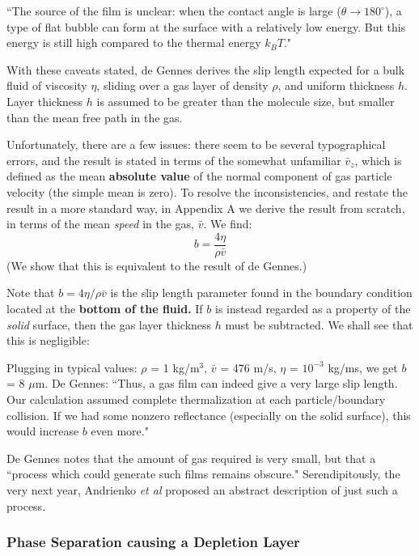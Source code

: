 \documentclass[12pt, a4paper, twoside, openright]{book}
\begin{document}
``The source of the film is unclear: when the contact angle is large ($\theta \rightarrow 180^{\circ}$), a type of flat bubble can form at the surface with a relatively low energy.  But this energy is still high compared to the thermal energy $k_{B} T$."

With these caveats stated, de Gennes derives the slip length expected for a bulk fluid of viscosity $\eta$, sliding over a gas layer of density $\rho$, and uniform thickness $h$. Layer thickness $h$ is assumed to be greater than the molecule size, but smaller than the mean free path in the gas.

Unfortunately, there are a few issues: there seem to be several typographical errors, and the result is stated in terms of the somewhat unfamiliar $\bar{v}_{z}$, which is  %
defined as the mean \textbf{absolute value} of the normal component of gas particle velocity (the simple mean is zero).  To resolve the inconsistencies, and restate the result in a more standard way, in Appendix A we derive the result from scratch, in terms of the mean \emph{speed} in the gas, $\bar{v}$.  We find:
\begin{equation}
b = \frac{4 \eta}{\rho \bar{v}}
\end{equation}
(We show that this is equivalent to the result of de Gennes.)

Note that $b = 4 \eta/ \rho \bar{v}$ is the slip length parameter found in the boundary condition located at the \textbf{bottom of the fluid.}  If $b$ is instead regarded as a property of the \emph{solid} surface, then the gas layer thickness $h$ must be subtracted.  We shall see that this is negligible:

Plugging in typical values: $\rho$ = 1 kg/m$^{3}$, $\bar{v}$ = 476 m/s, $\eta$ = $10^{-3}$ kg/ms, we get $b$ = 8 $\mu$m. De Gennes: ``Thus, a gas film can indeed give a very large slip length.  Our calculation assumed complete thermalization at each particle/boundary collision.  If we had some nonzero reflectance (especially on the solid surface), this would increase $b$ even more."

De Gennes notes that the amount of gas required is very small, but that a ``process which could generate such films remains obscure."  Serendipitously, the very next year, Andrienko \emph{et al} proposed an abstract description of just such a process.

\clearpage
\subsubsection{Phase Separation causing a Depletion Layer}
\end{document}
